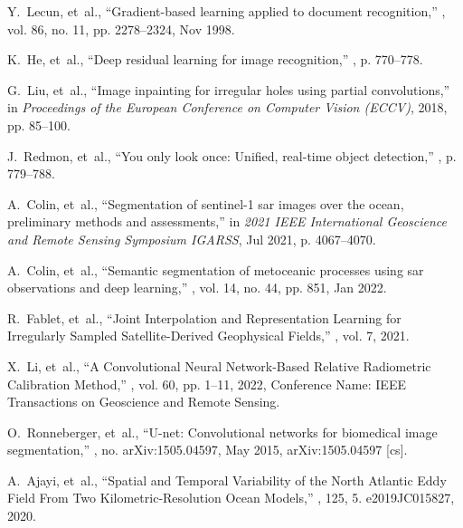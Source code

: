 \begin{bibunit}
\begin{thebibliography}{10}
Y.~Lecun, et~al.,
\newblock ``Gradient-based learning applied to document recognition,''
, vol. 86, no. 11, pp. 2278–2324, Nov
  1998.

K.~He, et~al.,
\newblock ``Deep residual learning for image recognition,''
, p. 770–778.

G.~Liu, et~al.,
\newblock ``Image inpainting for irregular holes using partial convolutions,''
\newblock in {\em Proceedings of the {European} {Conference} on {Computer}
  {Vision} ({ECCV})}, 2018, pp. 85--100.

J.~Redmon, et~al.,
\newblock ``You only look once: Unified, real-time object detection,''
, p. 779–788.

A.~Colin, et~al.,
\newblock ``Segmentation of sentinel-1 sar images over the ocean, preliminary
  methods and assessments,''
\newblock in {\em 2021 IEEE International Geoscience and Remote Sensing
  Symposium IGARSS}, Jul 2021, p. 4067–4070.

A.~Colin, et~al.,
\newblock ``Semantic segmentation of metoceanic processes using sar
  observations and deep learning,''
, vol. 14, no. 44, pp. 851, Jan 2022.

R.~Fablet, et~al.,
\newblock ``Joint {Interpolation} and {Representation} {Learning} for
  {Irregularly} {Sampled} {Satellite}-{Derived} {Geophysical} {Fields},''
, vol. 7, 2021.

X.~Li, et~al.,
\newblock ``A {Convolutional} {Neural} {Network}-{Based} {Relative}
  {Radiometric} {Calibration} {Method},''
, vol. 60,
  pp. 1--11, 2022,
\newblock Conference Name: IEEE Transactions on Geoscience and Remote Sensing.

O.~Ronneberger, et~al.,
\newblock ``U-net: Convolutional networks for biomedical image segmentation,''
\newblock , no. arXiv:1505.04597, May 2015,
\newblock arXiv:1505.04597 [cs].

A.~Ajayi, et~al.,
\newblock ``Spatial and {Temporal} {Variability} of the {North} {Atlantic}
  {Eddy} {Field} {From} {Two} {Kilometric}-{Resolution} {Ocean} {Models},''
, 125, 5.
  e2019JC015827, 2020.


\end{thebibliography}
\end{bibunit}
